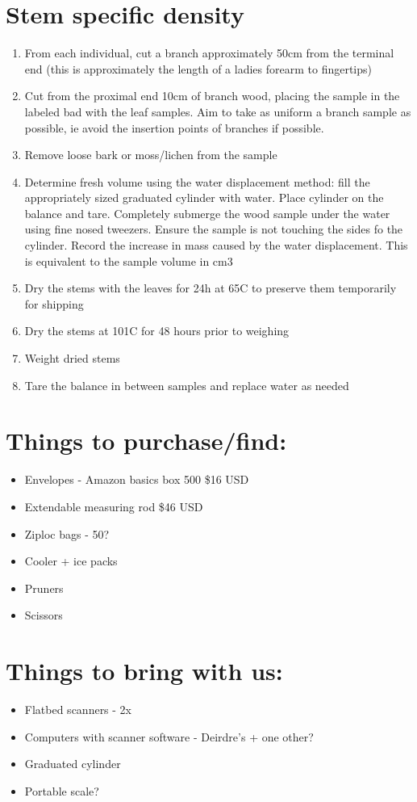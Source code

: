 \documentclass[11pt,letter]{article}
\begin{document}
\section{Stem specific density}
\begin{enumerate}
\item From each individual, cut a branch approximately 50cm from the terminal end (this is approximately the length of a ladies forearm to fingertips) 
\item Cut from the proximal end 10cm of branch wood, placing the sample in the labeled bad with the leaf samples. Aim to take as uniform a branch sample as possible, ie avoid the insertion points of branches if possible.
\item Remove loose bark or moss/lichen from the sample
\item Determine fresh volume using the water displacement method: fill the appropriately sized graduated cylinder with water. Place cylinder on the balance and tare. Completely submerge the wood sample under the water using fine nosed tweezers. Ensure the sample is not touching the sides fo the cylinder. Record the increase in mass caused by the water displacement. This is equivalent to the sample volume in cm3
\item Dry the stems with the leaves for 24h at 65C to preserve them temporarily for shipping
\item Dry the stems at 101C for 48 hours prior to weighing
\item Weight dried stems 
\item Tare the balance in between samples and replace water as needed
\end{enumerate}

\section{Things to purchase/find:}
\begin{itemize}
\item Envelopes - Amazon basics box 500 \$16 USD
\item Extendable measuring rod \$46 USD
\item Ziploc bags - 50?
\item Cooler + ice packs
\item Pruners
\item Scissors 
\end{itemize}

\section{Things to bring with us:}

\begin{itemize}
\item Flatbed scanners - 2x
\item Computers with scanner software - Deirdre's + one other?
\item Graduated cylinder
\item Portable scale? 
\end{itemize}
\end{document}
